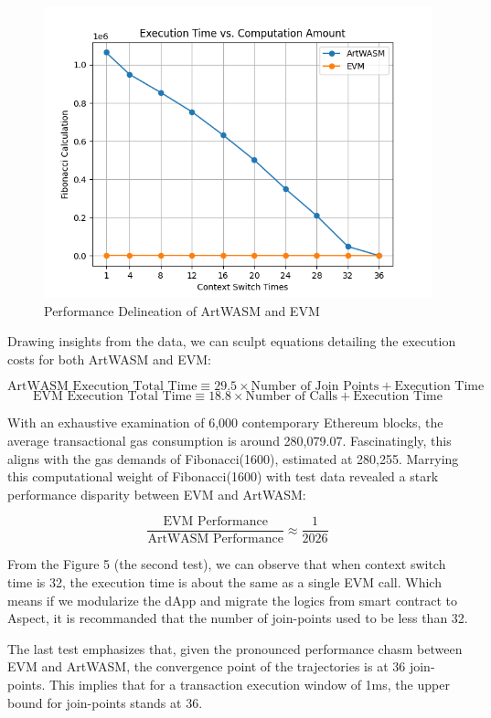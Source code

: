 \begin{figure}[htp]
\begin{minipage}{0.3\textwidth}
    \centering
    \includegraphics[width=1\linewidth]{sections/tx-latency-na-vs-jpc.png}
    \caption{Performance Delineation of ArtWASM and EVM}
    \label{fig:image3}
  \end{minipage}
\end{figure}

Drawing insights from the data, we can sculpt equations detailing the execution costs for both ArtWASM and EVM:

\[
\text{ArtWASM Execution Total Time} \equiv 29.5 \times \text{Number of Join Points} + \text{Execution Time}
\]
\[
\text{EVM Execution Total Time} \equiv 18.8 \times \text{Number of Calls} + \text{Execution Time}
\]

With an exhaustive examination of 6,000 contemporary Ethereum blocks, the average transactional gas consumption is around 280,079.07. Fascinatingly, this aligns with the gas demands of Fibonacci(1600), estimated at 280,255. Marrying this computational weight of Fibonacci(1600) with test data revealed a stark performance disparity between EVM and ArtWASM:

\[
  \frac{\text{EVM Performance}}{\text{ArtWASM Performance}} \approx \frac{1}{2026}
\]

From the Figure 5 (the second test), we can observe that when context switch time is 32, the execution time is about the same as a single EVM call. Which means if we modularize the dApp and migrate the logics from smart contract to Aspect, it is recommanded that the number of join-points used to be less than 32.

The last test emphasizes that, given the pronounced performance chasm between EVM and ArtWASM, the convergence point of the trajectories is at 36 join-points. This implies that for a transaction execution window of 1ms, the upper bound for join-points stands at 36.

